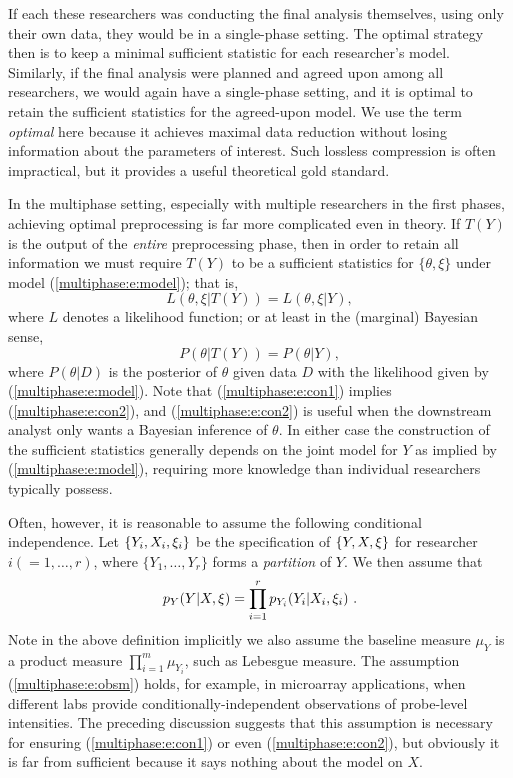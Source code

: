 If each these researchers was conducting the final analysis themselves, using only their own data, they would be in a single-phase setting.
The optimal strategy then is  to keep a minimal sufficient statistic for each researcher's model. 
Similarly, if the final analysis were planned and agreed upon among all researchers, we would again have a single-phase setting,  and  it is optimal to retain the sufficient statistics for the agreed-upon model.
We use the term \textit{optimal} here because it achieves maximal data reduction without losing information about the parameters of interest.
Such lossless compression is often impractical, but it provides a useful theoretical gold standard.%

In the multiphase setting, especially with multiple researchers in the first phases, achieving optimal preprocessing is far more complicated even in theory.
If $T(Y)$ is  the output of the \textit{entire} preprocessing phase, then in order to retain all information we must require $T(Y)$ to be a sufficient statistics for $\{\theta,\xi\}$ under model (\ref{multiphase:e:model}); that is, 
\begin{equation}\label{multiphase:e:con1}  
L(\theta,\xi|T(Y))=L(\theta,\xi|Y),
\end{equation}
where $L$ denotes a likelihood function;  or at least in the (marginal) Bayesian sense,
\begin{equation}\label{multiphase:e:con2}
P(\theta|T(Y))=P(\theta|Y),
\end{equation}
where $P(\theta|D)$ is the posterior of $\theta$ given data $D$ with the likelihood given by  (\ref{multiphase:e:model}).
Note  that (\ref{multiphase:e:con1}) implies (\ref{multiphase:e:con2}), and (\ref{multiphase:e:con2}) is useful when the downstream analyst only wants a Bayesian inference of $\theta$.
In either case the construction of the sufficient statistics  generally depends on the joint model for $Y$ as implied by (\ref{multiphase:e:model}), requiring more knowledge than individual researchers typically possess.

Often, however, it is reasonable to assume the following conditional independence.
Let $\{Y_i, X_i, \xi_i\}$ be the specification of $\{Y, X, \xi\}$ for researcher $i(=1,\ldots, r)$, where $\{Y_1,\ldots, Y_r\}$ forms a \textit{partition} of $Y$.  We then assume that
\begin{equation}\label{multiphase:e:obsm}
 \pobs(Y | X, \obsparam)= \prod_{i=1}^r p_{Y_i}(Y_i | X_i, \obsparam_i)\ .
\end{equation}
Note in the above definition implicitly we also assume the baseline measure $\mu_Y$ is a product measure $\prod_{i=1}^m \mu_{Y_i}$, such as Lebesgue measure.
The assumption (\ref{multiphase:e:obsm}) holds, for example, in microarray applications, when different labs provide conditionally-independent observations of probe-level intensities.
The preceding discussion suggests that this assumption is necessary for ensuring (\ref{multiphase:e:con1}) or even (\ref{multiphase:e:con2}), but obviously it is far from sufficient because it says nothing about the model on $X$.

